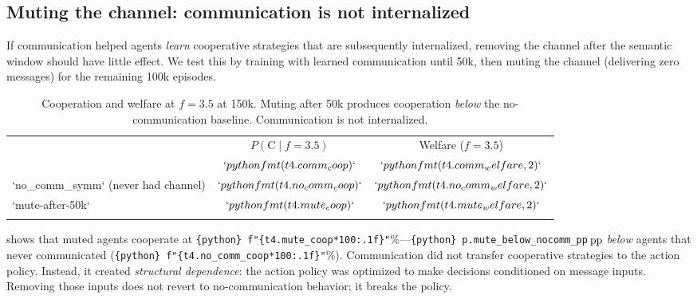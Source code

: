 \documentclass[
  10pt,
  letterpaper,
]{article}
\newcommand{\pcoopgiven}[1]{P(\text{C} \mid #1)}
\newcommand{\pp}{\text{\,pp}}
\begin{document}
\hypertarget{sec-mute}{%
\subsection{Muting the channel: communication is not
internalized}\label{sec-mute}}

If communication helped agents \emph{learn} cooperative strategies that
are subsequently internalized, removing the channel after the semantic
window should have little effect. We test this by training with learned
communication until 50k, then muting the channel (delivering zero
messages) for the remaining 100k episodes.

\begin{table}[t]
  \caption{Cooperation and welfare at $f\!=\!3.5$ at 150k. Muting after 50k produces cooperation \emph{below} the no-communication baseline. Communication is not internalized.}
  
  \centering
  \small
  \begin{tabular}{lcc}
    \toprule

\begin{verbatim}
Condition & $\pcoopgiven{f\!=\!3.5}$ & Welfare ($f\!=\!3.5$) \\
\end{verbatim}

    \midrule

\begin{verbatim}
`comm_symm` (channel stays on)    & $`{python} fmt(t4.comm_coop)`$ & $`{python} fmt(t4.comm_welfare, 2)`$ \\
`no_comm_symm` (never had channel) & $`{python} fmt(t4.no_comm_coop)`$ & $`{python} fmt(t4.no_comm_welfare, 2)`$ \\
`mute-after-50k`                   & $`{python} fmt(t4.mute_coop)`$ & $`{python} fmt(t4.mute_welfare, 2)`$ \\
\end{verbatim}

    \bottomrule
  \end{tabular}
\end{table}

\citet{tab:mute} shows that muted agents cooperate at
\texttt{\{python\}\ f"\{t4.mute\_coop*100:.1f\}"}\%---\texttt{\{python\}\ p.mute\_below\_nocomm\_pp}\(\pp\)
\emph{below} agents that never communicated
(\texttt{\{python\}\ f"\{t4.no\_comm\_coop*100:.1f\}"}\%). Communication
did not transfer cooperative strategies to the action policy. Instead,
it created \emph{structural dependence}: the action policy was optimized
to make decisions conditioned on message inputs. Removing those inputs
does not revert to no-communication behavior; it breaks the policy.
\end{document}

